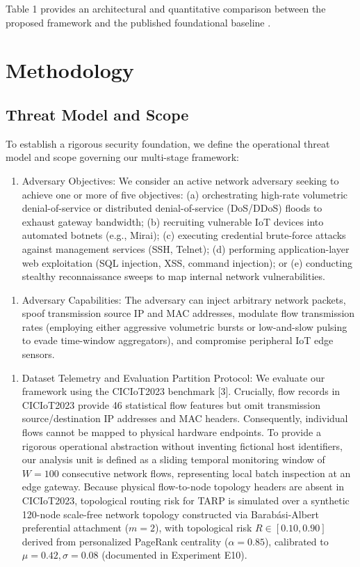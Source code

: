 \documentclass[journal,10pt,onecolumn]{IEEEtran}
\begin{document}
Table 1 provides an architectural and quantitative comparison between the proposed framework and the published foundational baseline \cite{1}.


\section{Methodology}


\subsection{Threat Model and Scope}
To establish a rigorous security foundation, we define the operational threat model and scope governing our multi-stage framework:

\begin{enumerate}
  \item Adversary Objectives: We consider an active network adversary seeking to achieve one or more of five objectives: (a) orchestrating high-rate volumetric denial-of-service or distributed denial-of-service (DoS/DDoS) floods to exhaust gateway bandwidth; (b) recruiting vulnerable IoT devices into automated botnets (e.g., Mirai); (c) executing credential brute-force attacks against management services (SSH, Telnet); (d) performing application-layer web exploitation (SQL injection, XSS, command injection); or (e) conducting stealthy reconnaissance sweeps to map internal network vulnerabilities.
\end{enumerate}

\begin{enumerate}
  \item Adversary Capabilities: The adversary can inject arbitrary network packets, spoof transmission source IP and MAC addresses, modulate flow transmission rates (employing either aggressive volumetric bursts or low-and-slow pulsing to evade time-window aggregators), and compromise peripheral IoT edge sensors.
\end{enumerate}

\begin{enumerate}
  \item Dataset Telemetry and Evaluation Partition Protocol: We evaluate our framework using the CICIoT2023 benchmark [3]. Crucially, flow records in CICIoT2023 provide 46 statistical flow features but omit transmission source/destination IP addresses and MAC headers. Consequently, individual flows cannot be mapped to physical hardware endpoints. To provide a rigorous operational abstraction without inventing fictional host identifiers, our analysis unit is defined as a sliding temporal monitoring window of $W = 100$ consecutive network flows, representing local batch inspection at an edge gateway. Because physical flow-to-node topology headers are absent in CICIoT2023, topological routing risk for TARP is simulated over a synthetic 120-node scale-free network topology constructed via Barabási-Albert preferential attachment ($m=2$), with topological risk $R \in [0.10, 0.90]$ derived from personalized PageRank centrality ($\alpha=0.85$), calibrated to $\mu=0.42, \sigma=0.08$ (documented in Experiment E10).
\end{enumerate}
\end{document}
